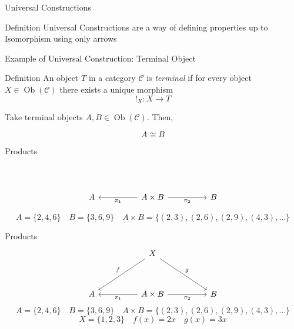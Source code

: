 \documentclass[aspectratio=169]{beamer}
\begin{document}
\begin{frame}[fragile]{Universal Constructions}
  \begin{block}{Definition}
    Universal Constructions are a way of defining properties up to Isomorphism using only arrows
  \end{block}
\end{frame}

\begin{frame}[fragile]{Example of Universal Construction: Terminal Object}
  \begin{block}{Definition}
    An object \(T\) in a category \(\mathcal{C}\) is \emph{terminal} if for every object \(X\in\operatorname{Ob}(\mathcal{C})\) there exists a unique morphism
    \[
      !_X: X \longrightarrow T
    \]
  \end{block}
  Take terminal objects $A, B \in \operatorname{Ob}(\mathcal{C})$. Then,
  \begin{center}
  \end{center}
  \[
    A \cong B
  \]
\end{frame}

\begin{frame}[fragile]{Products}
  \[
    \begin{tikzcd}[row sep=huge, column sep=huge]
      &  & \\
      A & A \times B  \arrow[l, "\pi_1"] \arrow[r, "\pi_2"'] & B
    \end{tikzcd}
  \]

  \[
    A = \big\{2, 4, 6\big\} \quad B = \big\{3, 6, 9\big\} \quad A \times B = \big\{(2, 3), (2, 6), (2, 9), (4, 3), \dots\big\}
  \]
  
\end{frame}

\begin{frame}[fragile]{Products}
  \[
    \begin{tikzcd}[row sep=huge, column sep=huge]
      & X \arrow[dl, "f"'] \arrow[dr, "g"] & \\
      A & A \times B  \arrow[l, "\pi_1"] \arrow[r, "\pi_2"'] & B
    \end{tikzcd}
  \]
  \[
    A = \big\{2, 4, 6\big\} \quad B = \big\{3, 6, 9\big\} \quad A \times B = \big\{(2, 3), (2, 6), (2, 9), (4, 3), \dots\big\}
  \]
  \[
    X = \big\{ 1, 2, 3 \big\} \quad f(x) = 2x \quad g(x) = 3x
  \]
\end{frame}
\end{document}
